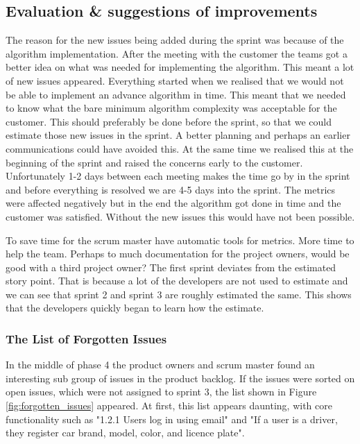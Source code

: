 \documentclass{article}
\begin{document}
\subsection{Evaluation \& suggestions of improvements}
The reason for the new issues being added during the sprint was because of the algorithm implementation. After the meeting with the customer the teams got a better idea on what was needed for implementing the algorithm. This meant a lot of new issues appeared. Everything started when we realised that we would not be able to implement an advance algorithm in time. This meant that we needed to know what the bare minimum algorithm complexity was acceptable for the customer. This should preferably be done before the sprint, so that we could estimate those new issues in the sprint. A better planning and perhaps an earlier communications could have avoided this. At the same time we realised this at the beginning of the sprint and raised the concerns early to the customer. Unfortunately 1-2 days between each meeting makes the time go by in the sprint and before everything is resolved we are 4-5 days into the sprint. The metrics were affected negatively but in the end the algorithm got done in time and the customer was satisfied. Without the new issues this would have not been possible.

To save time for the scrum master have automatic tools for metrics. More time to help the team. Perhaps to much documentation for the project owners, would be good with a third project owner?
The first sprint deviates from the  estimated story point. That is because a lot of the developers are not used to estimate and we can see that sprint 2 and sprint 3 are roughly estimated the same. This shows that the developers quickly began to learn how the estimate.

\subsubsection{The List of Forgotten Issues}

In the middle of phase 4 the product owners and scrum master found an interesting sub group of issues in the product backlog. If the issues were sorted on open issues, which were not assigned to sprint 3, the list shown in Figure \ref{fig:forgotten_issues} appeared. At first, this list appears daunting, with core functionality such as "1.2.1 Users log in using email" and "If a user is a driver, they register car brand, model, color, and licence plate".
\end{document}
